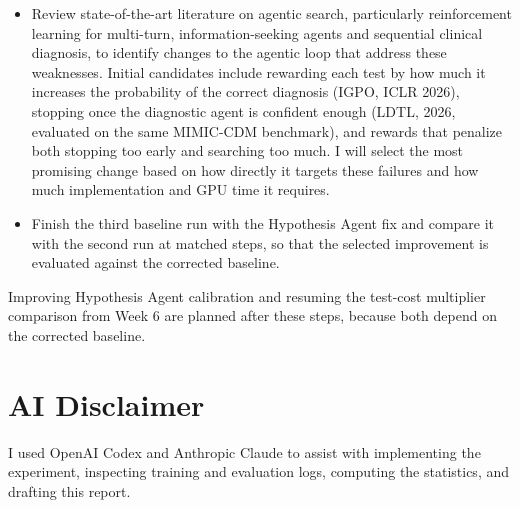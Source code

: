 \documentclass[11pt]{article}
\begin{document}
\begin{itemize}
  \item Review state-of-the-art literature on agentic search, particularly
        reinforcement learning for multi-turn, information-seeking agents and
        sequential clinical diagnosis, to identify changes to the agentic loop
        that address these weaknesses. Initial candidates include rewarding
        each test by how much it increases the probability of the correct
        diagnosis (IGPO, ICLR 2026), stopping once the diagnostic agent is
        confident enough (LDTL, 2026, evaluated on the same MIMIC-CDM
        benchmark), and rewards that penalize both stopping too early and
        searching too much. I will select the most promising change based on
        how directly it targets these failures and how much implementation
        and GPU time it requires.
  \item Finish the third baseline run with the Hypothesis Agent fix and compare
        it with the second run at matched steps, so that the selected
        improvement is evaluated against the corrected baseline.
\end{itemize}

Improving Hypothesis Agent calibration and resuming the test-cost multiplier
comparison from Week 6 are planned after these steps, because both depend on
the corrected baseline.

\section{AI Disclaimer}

I used OpenAI Codex and Anthropic Claude to assist with implementing the
experiment, inspecting training and evaluation logs, computing the statistics,
and drafting this report.
\end{document}
